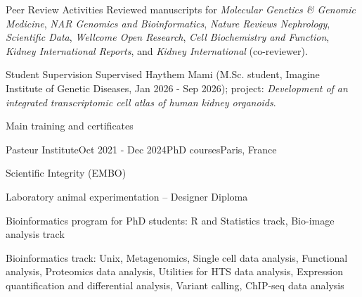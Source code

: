 \documentclass[
	11pt, %
]{resume} %
\begin{document}

\begin{rSection}{Peer Review Activities}
Reviewed manuscripts for  \textit{Molecular Genetics \& Genomic Medicine}, \textit{NAR Genomics and Bioinformatics}, \textit{Nature Reviews Nephrology}, \textit{Scientific Data}, \textit{Wellcome Open Research}, \textit{Cell Biochemistry and Function}, \textit{Kidney International Reports}, and \textit{Kidney International} (co-reviewer).
\end{rSection}

\begin{rSection}{Student Supervision}
Supervised Haythem Mami (M.Sc. student, Imagine Institute of Genetic Diseases, Jan 2026 - Sep 2026); project: \textit{Development of an integrated transcriptomic cell atlas of human kidney organoids}.
\end{rSection}



\begin{rSection}{Main training and certificates}

	\begin{rSubsection}{Pasteur Institute}{Oct 2021 - Dec 2024}{PhD courses}{Paris, France}
		\item Scientific Integrity (EMBO)
		\item Laboratory animal experimentation – Designer Diploma
		\item Bioinformatics program for PhD students: R and Statistics track, Bio-image
analysis track
		\item Bioinformatics track: Unix, Metagenomics, Single cell data analysis, Functional analysis, Proteomics data
analysis, Utilities for HTS data analysis, Expression quantification and differential analysis, Variant
calling, ChIP-seq data analysis
	\end{rSubsection}
	
\end{rSection}
\end{document}
